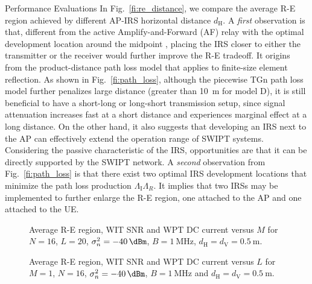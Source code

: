 \documentclass[journal]{IEEEtran}
\begin{document}
\begin{section}{Performance Evaluations}
		In Fig.~\ref{fi:re_distance}, we compare the average R-E region achieved by different AP-IRS horizontal distance $d_{\mathrm{H}}$. A \textit{first} observation is that, different from the active Amplify-and-Forward (AF) relay with the optimal development location around the midpoint \cite{Li2017}, placing the IRS closer to either the transmitter or the receiver would further improve the R-E tradeoff. It origins from the product-distance path loss model that applies to finite-size element reflection. As shown in Fig.~\ref{fi:path_loss}, although the piecewise TGn path loss model further penalizes large distance (greater than \SI{10}{\meter} for model D), it is still beneficial to have a short-long or long-short transmission setup, since signal attenuation increases fast at a short distance and experiences marginal effect at a long distance. On the other hand, it also suggests that developing an IRS next to the AP can effectively extend the operation range of SWIPT systems. Considering the passive characteristic of the IRS, opportunities are that it can be directly supported by the SWIPT network. A \textit{second} observation from Fig.~\ref{fi:path_loss} is that there exist two optimal IRS development locations that minimize the path loss production $\Lambda_{\mathrm{I}}\Lambda_R$. It implies that two IRSs may be implemented to further enlarge the R-E region, one attached to the AP and one attached to the UE.

		\begin{figure}[!t]
			\centering
			\caption{Average R-E region, WIT SNR and WPT DC current versus $M$ for $N=16$, $L=20$, $\sigma_n^2=\SI{-40}{\dBm}$, $B=\SI{1}{\MHz}$, $d_{\mathrm{H}}=d_{\mathrm{V}}=\SI{0.5}{\meter}$.}
		\end{figure}

		\begin{figure}[!t]
			\centering
			\caption{Average R-E region, WIT SNR and WPT DC current versus $L$ for $M=1$, $N=16$, $\sigma_n^2=\SI{-40}{\dBm}$, $B=\SI{1}{\MHz}$ and $d_{\mathrm{H}}=d_{\mathrm{V}}=\SI{0.5}{\meter}$.}
		\end{figure}


\end{section}
\end{document}
